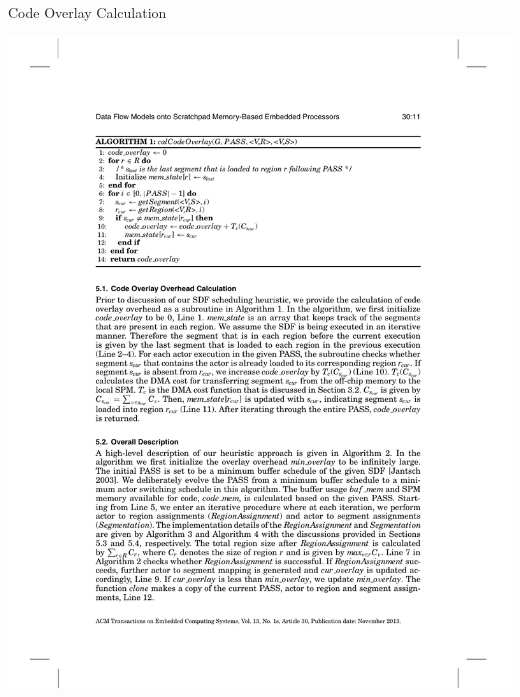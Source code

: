 \documentclass{beamer}
\begin{document}
\begin{frame}{Code Overlay Calculation}
  \begin{center}
    \hspace*{-0.1\textwidth}
    \includegraphics[width=1.2\textwidth]{algo1}
  \end{center}
\end{frame}
\end{document}

